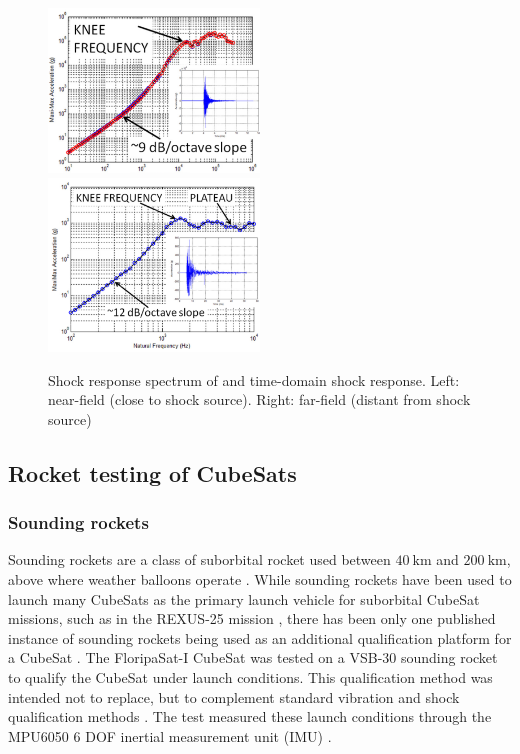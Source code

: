 \documentclass[a4paper,11pt]{article}
\begin{document}
\begin{figure}[H]
  \includegraphics[width=0.5\textwidth]{images/pyroshock2.png}
  \includegraphics[width=0.5\textwidth]{images/pyroshock1.png}
  \caption{Shock response spectrum of and time-domain shock response. Left: near-field (close to shock source). Right: far-field (distant from shock source) \cite{nasa-pyroshock}}
  \label{fig:pyroshock}
\end{figure}


\subsection{Rocket testing of CubeSats}
\subsubsection{Sounding rockets}
Sounding rockets are a class of suborbital rocket used between $\SI{40}{\kilo\metre}$ and $\SI{200}{\kilo\metre}$, above where weather balloons operate \cite{seibert2006history}. While sounding rockets have been used to launch many CubeSats as the primary launch vehicle for suborbital CubeSat missions, such as in the REXUS-25 mission \cite{pont2019rexus}, there has been only one published instance of sounding rockets being used as an additional qualification platform for a CubeSat \cite{slongo2019pre}. The FloripaSat-I CubeSat was tested on a VSB-30 sounding rocket \cite{slongo2019pre} to qualify the CubeSat under launch conditions. This qualification method was intended not to replace, but to complement standard vibration and shock qualification methods \cite{slongo2019pre}. The test measured these launch conditions through the MPU6050 6 DOF inertial measurement unit (IMU) \cite{slongo2019pre}.
\end{document}
